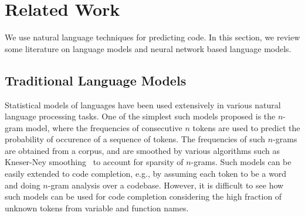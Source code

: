 \section{Related Work}
\label{sec:related}

We use natural language techniques for predicting code.
In this section, we review some literature on language models and
neural network based language models.

\subsection{Traditional Language Models}
Statistical models of languages have been used extensively in various natural
language processing tasks. One of the simplest such models proposed is the
$n$-gram model, where the frequencies of consecutive $n$ tokens are used to
predict the probability of occurence of a sequence of tokens. The frequencies of
such $n$-grams are obtained from a corpus, and are smoothed by various
algorithms such as Kneser-Ney smoothing~\cite{ref:kneser-ney} to account for
sparsity of $n$-grams. Such models can be easily extended to code completion,
e.g., by assuming each token to be a word and doing $n$-gram analysis over a
codebase. However, it is difficult to see how such models can be
used for code completion considering the high fraction of unknown tokens
from variable and function names.

